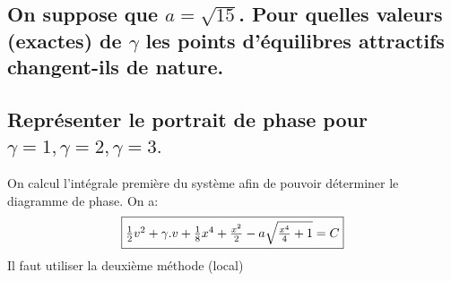 \documentclass[10pt,a4paper]{article}
\begin{document}
\subsection{On suppose que $a=\sqrt{15}$. Pour quelles valeurs (exactes) de $\gamma$ les points d'équilibres attractifs changent-ils de nature.}

\subsection{Représenter le portrait de phase pour $\gamma=1, \gamma=2, \gamma=3.$}
On calcul l'intégrale première du système afin de pouvoir déterminer le diagramme de phase. On a:
\[\fbox{$ \frac{1}{2}v^2 + \gamma.v + \frac{1}{8}x^4 + \frac{x^2}{2} - a\sqrt{\frac{x^4}{4} + 1} = C  $}\]
Il faut utiliser la deuxième méthode (local)
\end{document}
